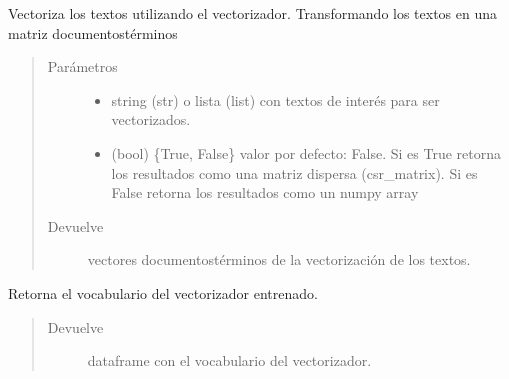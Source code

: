 \documentclass[letterpaper,10pt,openany,spanish]{sphinxmanual}
\begin{document}
\begin{fulllineitems}
\begin{fulllineitems}
\label{\detokenize{funciones/vectorizacion:vectorizacion.VectorizadorFrecuencias.vectorizar}}
Vectoriza los textos utilizando el vectorizador. 
Transformando los textos en una matriz documentos\sphinxhyphen{}términos
\begin{quote}\begin{description}
\item[{Parámetros}] \leavevmode\begin{itemize}
\item {} 
 \textendash{} string (str) o lista (list) con textos de interés 
para ser vectorizados.

\item {} 
 \textendash{} (bool) \{True, False\} valor por defecto: False. 
Si es True retorna los resultados como una matriz dispersa 
(csr\_matrix). Si es False retorna los resultados como un numpy array

\end{itemize}

\item[{Devuelve}] \leavevmode
vectores documentos\sphinxhyphen{}términos de la vectorización de los textos.

\end{description}\end{quote}

\end{fulllineitems}


\begin{fulllineitems}
\label{\detokenize{funciones/vectorizacion:vectorizacion.VectorizadorFrecuencias.vocabulario}}
Retorna el vocabulario del vectorizador entrenado.
\begin{quote}\begin{description}
\item[{Devuelve}] \leavevmode
dataframe con el vocabulario del vectorizador.

\end{description}\end{quote}

\end{fulllineitems}


\end{fulllineitems}
\end{document}
